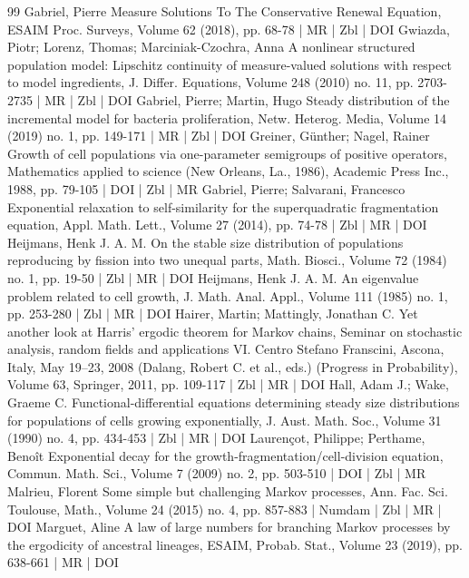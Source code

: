 \documentclass[10pt]{amsart}
\theoremstyle{definition}\newtheorem{defi}[theo]{Definition}\newtheorem{rema}[theo]{Remark}\newtheorem{exam}[theo]{Example}\newtheorem{exem}[theo]{Example}\newtheorem{nota}[theo]{Notation}
\newcommand{\1}{\mathds{1}}
\begin{document}
\begin{thebibliography}{99}
Gabriel, Pierre Measure Solutions To The Conservative Renewal Equation, ESAIM Proc. Surveys, Volume 62 (2018), pp. 68-78 | MR | Zbl | DOI
Gwiazda, Piotr; Lorenz, Thomas; Marciniak-Czochra, Anna A nonlinear structured population model: Lipschitz continuity of measure-valued solutions with respect to model ingredients, J. Differ. Equations, Volume 248 (2010) no. 11, pp. 2703-2735 | MR | Zbl | DOI
Gabriel, Pierre; Martin, Hugo Steady distribution of the incremental model for bacteria proliferation, Netw. Heterog. Media, Volume 14 (2019) no. 1, pp. 149-171 | MR | Zbl | DOI
Greiner, Günther; Nagel, Rainer Growth of cell populations via one-parameter semigroups of positive operators, Mathematics applied to science (New Orleans, La., 1986), Academic Press Inc., 1988, pp. 79-105 | DOI | Zbl | MR
Gabriel, Pierre; Salvarani, Francesco Exponential relaxation to self-similarity for the superquadratic fragmentation equation, Appl. Math. Lett., Volume 27 (2014), pp. 74-78 | Zbl | MR | DOI
Heijmans, Henk J. A. M. On the stable size distribution of populations reproducing by fission into two unequal parts, Math. Biosci., Volume 72 (1984) no. 1, pp. 19-50 | Zbl | MR | DOI
Heijmans, Henk J. A. M. An eigenvalue problem related to cell growth, J. Math. Anal. Appl., Volume 111 (1985) no. 1, pp. 253-280 | Zbl | MR | DOI
Hairer, Martin; Mattingly, Jonathan C. Yet another look at Harris’ ergodic theorem for Markov chains, Seminar on stochastic analysis, random fields and applications VI. Centro Stefano Franscini, Ascona, Italy, May 19–23, 2008 (Dalang, Robert C. et al., eds.) (Progress in Probability), Volume 63, Springer, 2011, pp. 109-117 | Zbl | MR | DOI
Hall, Adam J.; Wake, Graeme C. Functional-differential equations determining steady size distributions for populations of cells growing exponentially, J. Aust. Math. Soc., Volume 31 (1990) no. 4, pp. 434-453 | Zbl | MR | DOI
Laurençot, Philippe; Perthame, Benoît Exponential decay for the growth-fragmentation/cell-division equation, Commun. Math. Sci., Volume 7 (2009) no. 2, pp. 503-510 | DOI | Zbl | MR
Malrieu, Florent Some simple but challenging Markov processes, Ann. Fac. Sci. Toulouse, Math., Volume 24 (2015) no. 4, pp. 857-883 | Numdam | Zbl | MR | DOI
Marguet, Aline A law of large numbers for branching Markov processes by the ergodicity of ancestral lineages, ESAIM, Probab. Stat., Volume 23 (2019), pp. 638-661 | MR | DOI

\end{thebibliography}
\end{document}
